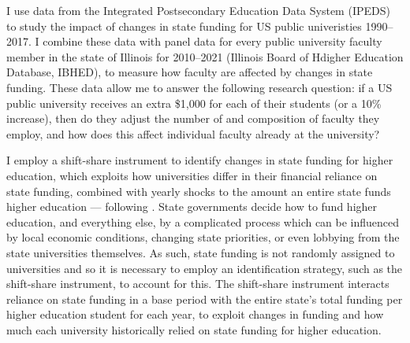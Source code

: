 I use data from the Integrated Postsecondary Education Data System (IPEDS) to study the impact of changes in state funding for US public univeristies 1990--2017.
I combine these data with panel data for every public university faculty member in the state of Illinois for 2010--2021 (Illinois Board of Hdigher Education Database, IBHED), to measure how faculty are affected by changes in state funding.
These data allow me to answer the following research question: if a US public university receives an extra \$1,000 for each of their students (or a 10\% increase), then do they adjust the number of and composition of faculty they employ, and how does this affect individual faculty already at the university?

I employ a shift-share instrument to identify changes in state funding for higher education, which exploits how universities differ in their financial reliance on state funding, combined with yearly shocks to the amount an entire state funds higher education --- following \cite{NBERw23736,NBERw27885}.
State governments decide how to fund higher education, and everything else, by a complicated process which can be influenced by local economic conditions, changing state priorities, or even lobbying from the state universities themselves.
As such, state funding is not randomly assigned to universities and so it is necessary to employ an identification strategy, such as the shift-share instrument, to account for this.
The shift-share instrument interacts reliance on state funding in a base period with the entire state's total funding per higher education student for each year, to exploit changes in funding and how much each university historically relied on state funding for higher education.

